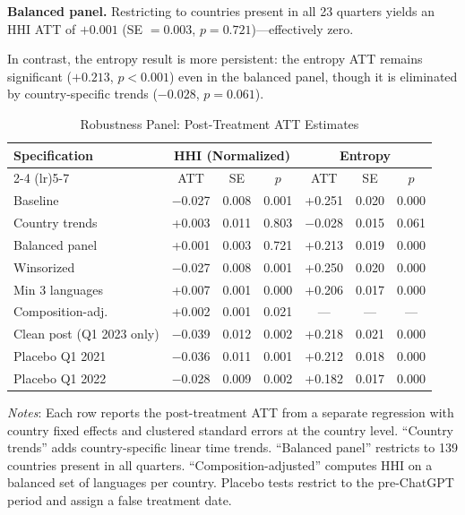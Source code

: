\documentclass[12pt]{article}
\begin{document}
\textbf{Balanced panel.} Restricting to countries present in all 23 quarters yields an HHI ATT of $+0.001$ (SE $= 0.003$, $p = 0.721$)---effectively zero.

In contrast, the entropy result is more persistent: the entropy ATT remains significant ($+0.213$, $p < 0.001$) even in the balanced panel, though it is eliminated by country-specific trends ($-0.028$, $p = 0.061$).

\begin{table}[H]
\centering
\begin{threeparttable}
\caption{Robustness Panel: Post-Treatment ATT Estimates}
\label{tab:robustness}
\small
\begin{tabular}{lcccccc}
\toprule
Specification & \multicolumn{3}{c}{HHI (Normalized)} & \multicolumn{3}{c}{Entropy} \\
\cmidrule(lr){2-4} \cmidrule(lr){5-7}
 & ATT & SE & $p$ & ATT & SE & $p$ \\
\midrule
Baseline & $-$0.027 & 0.008 & 0.001 & +0.251 & 0.020 & 0.000 \\
Country trends & +0.003 & 0.011 & 0.803 & $-$0.028 & 0.015 & 0.061 \\
Balanced panel & +0.001 & 0.003 & 0.721 & +0.213 & 0.019 & 0.000 \\
Winsorized & $-$0.027 & 0.008 & 0.001 & +0.250 & 0.020 & 0.000 \\
Min 3 languages & +0.007 & 0.001 & 0.000 & +0.206 & 0.017 & 0.000 \\
Composition-adj. & +0.002 & 0.001 & 0.021 & --- & --- & --- \\
Clean post (Q1 2023 only) & $-$0.039 & 0.012 & 0.002 & +0.218 & 0.021 & 0.000 \\
\midrule
Placebo Q1 2021 & $-$0.036 & 0.011 & 0.001 & +0.212 & 0.018 & 0.000 \\
Placebo Q1 2022 & $-$0.028 & 0.009 & 0.002 & +0.182 & 0.017 & 0.000 \\
\bottomrule
\end{tabular}
\begin{tablenotes}
\small
\item \textit{Notes}: Each row reports the post-treatment ATT from a separate regression with country fixed effects and clustered standard errors at the country level. ``Country trends'' adds country-specific linear time trends. ``Balanced panel'' restricts to 139 countries present in all quarters. ``Composition-adjusted'' computes HHI on a balanced set of languages per country. Placebo tests restrict to the pre-ChatGPT period and assign a false treatment date.
\end{tablenotes}
\end{threeparttable}
\end{table}
\end{document}
